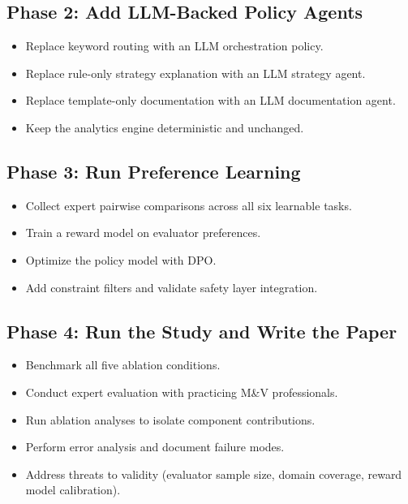 \documentclass[11pt,a4paper]{article}
\begin{document}
\subsection{Phase 2: Add LLM-Backed Policy Agents}
\begin{itemize}
    \item Replace keyword routing with an LLM orchestration policy.
    \item Replace rule-only strategy explanation with an LLM strategy agent.
    \item Replace template-only documentation with an LLM documentation agent.
    \item Keep the analytics engine deterministic and unchanged.
\end{itemize}

\subsection{Phase 3: Run Preference Learning}
\begin{itemize}
    \item Collect expert pairwise comparisons across all six learnable tasks.
    \item Train a reward model on evaluator preferences.
    \item Optimize the policy model with DPO.
    \item Add constraint filters and validate safety layer integration.
\end{itemize}

\subsection{Phase 4: Run the Study and Write the Paper}
\begin{itemize}
    \item Benchmark all five ablation conditions.
    \item Conduct expert evaluation with practicing M\&V professionals.
    \item Run ablation analyses to isolate component contributions.
    \item Perform error analysis and document failure modes.
    \item Address threats to validity (evaluator sample size, domain coverage, reward model calibration).
\end{itemize}

\end{document}
